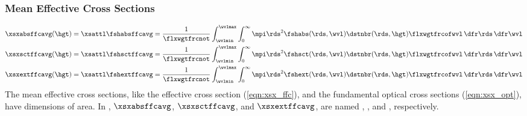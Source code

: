 \documentclass[12pt]{article}
\begin{document}
\subsubsection[Mean Effective Cross Sections]{Mean Effective Cross Sections}\label{sxn:xsx_ffc_avg}
\begin{subequations}
\label{eqn:xsx_ffc_avg}
\begin{align}
\label{eqn:xsx_abs_ffc_avg}
\xsxabsffcavg(\hgt) & = \xsattl \fshabsffcavg =
\frac{1}{\flxwgtfrcnot} \int_{\wvlmin}^{\wvlmax} \int_{0}^{\infty}
\mpi \rds^{2} \fshabs(\rds,\wvl) \dstnbr(\rds,\hgt) \flxwgtfrcofwvl
\,\dfr\rds \,\dfr\wvl \\
\label{eqn:xsx_sct_ffc_avg}
\xsxsctffcavg(\hgt) & = \xsattl \fshsctffcavg =
\frac{1}{\flxwgtfrcnot} \int_{\wvlmin}^{\wvlmax} \int_{0}^{\infty}
\mpi \rds^{2} \fshsct(\rds,\wvl) \dstnbr(\rds,\hgt) \flxwgtfrcofwvl
\,\dfr\rds \,\dfr\wvl \\
\label{eqn:xsx_ext_ffc_avg}
\xsxextffcavg(\hgt) & = \xsattl \fshextffcavg =
\frac{1}{\flxwgtfrcnot} \int_{\wvlmin}^{\wvlmax} \int_{0}^{\infty}
\mpi \rds^{2} \fshext(\rds,\wvl) \dstnbr(\rds,\hgt) \flxwgtfrcofwvl
\,\dfr\rds \,\dfr\wvl
\end{align}
\end{subequations}
The mean effective cross sections, like the effective cross section
(\ref{eqn:xsx_ffc}), and the fundamental optical cross sections
(\ref{eqn:xsx_opt}), have dimensions of area.
In , $\xsxabsffcavg$, $\xsxsctffcavg$, and
$\xsxextffcavg$, are named ,
, and , respectively. 
\end{document}
